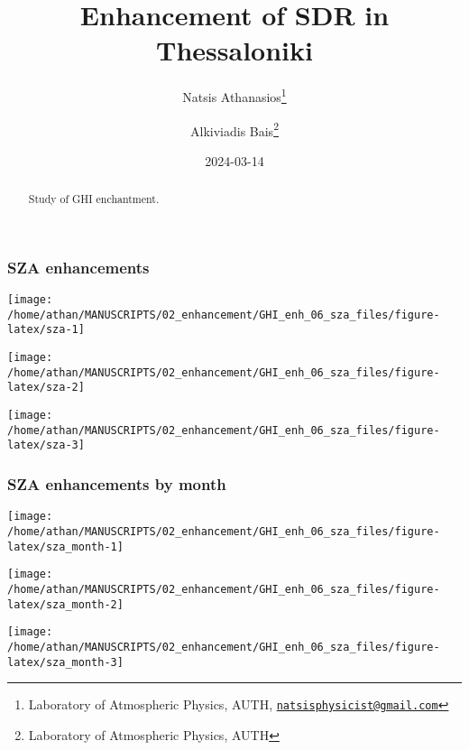 \documentclass[
  10pt,
  a4paper,oneside]{article}
\title{Enhancement of SDR in Thessaloniki}
\author{Natsis Athanasios\footnote{Laboratory of Atmospheric Physics, AUTH, \href{mailto:natsisphysicist@gmail.com}{\nolinkurl{natsisphysicist@gmail.com}}} \and Alkiviadis Bais\footnote{Laboratory of Atmospheric Physics, AUTH}}
\date{2024-03-14}
\begin{document}
\maketitle
\begin{abstract}
Study of GHI enchantment.
\end{abstract}

{
\hypersetup{linkcolor=}
\setcounter{tocdepth}{4}
\tableofcontents
}
\newpage
\FloatBarrier

\hypertarget{sza-enhancements}{%
\subsubsection{SZA enhancements}\label{sza-enhancements}}

\begin{center}\texttt{[image: /home/athan/MANUSCRIPTS/02\_enhancement/GHI\_enh\_06\_sza\_files/figure-latex/sza-1]} \end{center}

\begin{center}\texttt{[image: /home/athan/MANUSCRIPTS/02\_enhancement/GHI\_enh\_06\_sza\_files/figure-latex/sza-2]} \end{center}

\begin{center}\texttt{[image: /home/athan/MANUSCRIPTS/02\_enhancement/GHI\_enh\_06\_sza\_files/figure-latex/sza-3]} \end{center}

\newpage
\FloatBarrier

\hypertarget{sza-enhancements-by-month}{%
\subsubsection{SZA enhancements by month}\label{sza-enhancements-by-month}}

\begin{center}\texttt{[image: /home/athan/MANUSCRIPTS/02\_enhancement/GHI\_enh\_06\_sza\_files/figure-latex/sza\_month-1]} \end{center}

\begin{center}\texttt{[image: /home/athan/MANUSCRIPTS/02\_enhancement/GHI\_enh\_06\_sza\_files/figure-latex/sza\_month-2]} \end{center}

\begin{center}\texttt{[image: /home/athan/MANUSCRIPTS/02\_enhancement/GHI\_enh\_06\_sza\_files/figure-latex/sza\_month-3]} \end{center}
\end{document}
